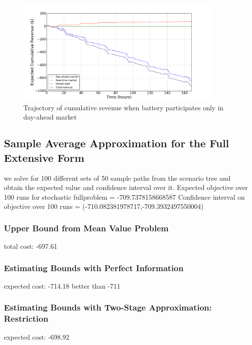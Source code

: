 \documentclass[11pt,twoside]{article}
\begin{document}
\begin{figure}[h!]
\begin{center}
\includegraphics[width=4in]
{Figures/Plots/onlydam/cumulative_rev_fp_st.pdf} \caption{Trajectory of cumulative revenue when battery participates only in day-ahead market}\label{fig:cumulative_rev_onlydam}\end{center}
\end{figure}

\subsection{Sample Average Approximation for the Full Extensive Form}
we solve for 100 different sets of 50 sample paths from the scenario tree and obtain the expected value and confidence interval over it. 
Expected objective over 100 runs for stochastic fullproblem = -709.7378158668587
Confidence interval on objective over 100 runs = (-710.082381978717,-709.3932497550004)
\subsubsection{Upper Bound from Mean Value Problem}
total cost: -697.61

\subsubsection{Estimating Bounds with Perfect Information}
expected cost: -714.18 better than -711

\subsubsection{Estimating Bounds with Two-Stage Approximation: Restriction}
expected cost: -698.92
\end{document}

